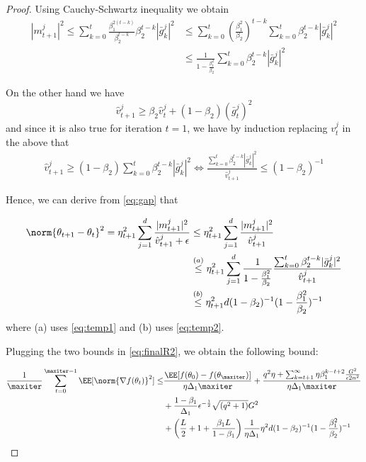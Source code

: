 \documentclass[11pt]{article}
\begin{document}
\begin{proof}
Using Cauchy-Schwartz inequality we obtain
\begin{equation}\label{eq:temp1}
\begin{split}
|m_{t+1}^j|^2  \leq \sum_{k=0}^t \frac{\beta_1^{2(t-k)}}{\beta_2^{t-k}}\beta_2^{t-k}|\bar g_k^j|^2 &\leq \sum_{k=0}^t \left(\frac{\beta_1^{2}}{\beta_2}\right)^{t-k}  \sum_{k=0}^t\beta_2^{t-k}|\bar g_k^j|^2\\
&\leq \frac{1}{1 - \frac{\beta_1^{2}}{\beta_2}} \sum_{k=0}^t\beta_2^{t-k}|\bar g_k^j|^2
\end{split}
\end{equation}

On the other hand we have
\begin{equation}
\hat{v}^j_{t+1} \geq \beta_2 \hat{v}^j_{t} + (1-\beta_2) (\bar g_t^j)^2
\end{equation}
and since it is also true for iteration $t=1$, we have by induction replacing $v_t^j$ in the above that 
\begin{equation}\label{eq:temp2}
\begin{split}
\hat{v}^j_{t+1} \geq (1-\beta_2) \sum_{k=0}^t\beta_2^{t-k}|\bar g_k^j|^2 \iff  \frac{\sum_{k=0}^t\beta_2^{t-k}|\bar g_k^j|^2}{ \hat{v}^j_{t+1}} \leq    (1-\beta_2)^{-1}
\end{split}
\end{equation}

Hence, we can derive from \eqref{eq:gap} that

\begin{equation}\label{eq:gap2}
\begin{split}
\norm{\theta_{t+1} - \theta_{t}}^2  = \eta_{t+1}^2 \sum_{j=1}^d  \frac{|m_{t+1}^j|^2}{\hat{v}^j_{t+1} + \epsilon}&\leq  \eta_{t+1}^2 \sum_{j=1}^d  \frac{|m_{t+1}^j|^2}{\hat{v}^j_{t+1}}\\
&\overset{(a)}{\leq}   \eta_{t+1}^2 \sum_{j=1}^d  \frac{1}{1 - \frac{\beta_1^{2}}{\beta_2}} \frac{\sum_{k=0}^t\beta_2^{t-k}|\bar g_k^j|^2}{\hat{v}^j_{t+1}}\\
&\overset{(b)}{\leq} \eta_{t+1}^2 d (1-\beta_2)^{-1} (1 - \frac{\beta_1^{2}}{\beta_2})^{-1}
\end{split}
\end{equation}
where (a) uses \eqref{eq:temp1} and (b) uses \eqref{eq:temp2}.


Plugging the two bounds in \eqref{eq:finalR2}, we obtain the following bound:

\begin{equation}
\begin{split}
 \frac{1}{\maxiter}\sum_{t=0}^{\maxiter -1} \EE[\norm{\nabla f(\theta_t)}^2] \leq & \frac{\EE[ f(\theta_{0}) - f(\theta_{\maxiter})]}{\eta \Delta_1 \maxiter} + \frac{q^2 \eta+ \sum_{k=t+1}^\infty \eta \beta_1^{k-t+2}\frac{G^2 }{\epsilon 2n^2}}{\eta \Delta_1\maxiter}\\
&+\frac{1-\beta_1}{\Delta_1}  \epsilon^{-\frac{1}{2}} \sqrt{(q^2+1)}G^2 \\
& + \left(\frac{L}{2} + 1+ \frac{\beta_1L}{1-\beta_1} \right)\frac{1}{\eta \Delta_1}  \eta^2 d (1-\beta_2)^{-1} (1 - \frac{\beta_1^{2}}{\beta_2})^{-1}
\end{split}
\end{equation}



\end{proof}
\end{document}
